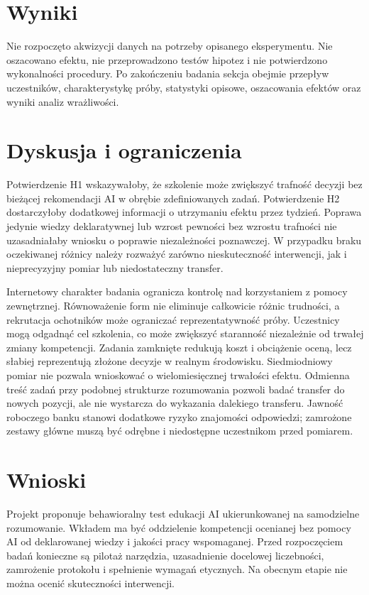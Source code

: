 \documentclass[11pt,a4paper]{article}
\begin{document}
\section{Wyniki}
Nie rozpoczęto akwizycji danych na potrzeby opisanego eksperymentu. Nie oszacowano efektu, nie przeprowadzono testów hipotez i nie potwierdzono wykonalności procedury. Po zakończeniu badania sekcja obejmie przepływ uczestników, charakterystykę próby, statystyki opisowe, oszacowania efektów oraz wyniki analiz wrażliwości.

\section{Dyskusja i ograniczenia}
Potwierdzenie H1 wskazywałoby, że szkolenie może zwiększyć trafność decyzji bez bieżącej rekomendacji AI w obrębie zdefiniowanych zadań. Potwierdzenie H2 dostarczyłoby dodatkowej informacji o utrzymaniu efektu przez tydzień. Poprawa jedynie wiedzy deklaratywnej lub wzrost pewności bez wzrostu trafności nie uzasadniałaby wniosku o poprawie niezależności poznawczej. W przypadku braku oczekiwanej różnicy należy rozważyć zarówno nieskuteczność interwencji, jak i nieprecyzyjny pomiar lub niedostateczny transfer.

Internetowy charakter badania ogranicza kontrolę nad korzystaniem z pomocy zewnętrznej. Równoważenie form nie eliminuje całkowicie różnic trudności, a rekrutacja ochotników może ograniczać reprezentatywność próby. Uczestnicy mogą odgadnąć cel szkolenia, co może zwiększyć staranność niezależnie od trwałej zmiany kompetencji. Zadania zamknięte redukują koszt i obciążenie oceną, lecz słabiej reprezentują złożone decyzje w realnym środowisku. Siedmiodniowy pomiar nie pozwala wnioskować o wielomiesięcznej trwałości efektu. Odmienna treść zadań przy podobnej strukturze rozumowania pozwoli badać transfer do nowych pozycji, ale nie wystarcza do wykazania dalekiego transferu. Jawność roboczego banku stanowi dodatkowe ryzyko znajomości odpowiedzi; zamrożone zestawy główne muszą być odrębne i niedostępne uczestnikom przed pomiarem.

\section{Wnioski}
Projekt proponuje behawioralny test edukacji AI ukierunkowanej na samodzielne rozumowanie. Wkładem ma być oddzielenie kompetencji ocenianej bez pomocy AI od deklarowanej wiedzy i jakości pracy wspomaganej. Przed rozpoczęciem badań konieczne są pilotaż narzędzia, uzasadnienie docelowej liczebności, zamrożenie protokołu i spełnienie wymagań etycznych. Na obecnym etapie nie można ocenić skuteczności interwencji.
\end{document}
